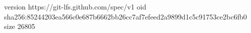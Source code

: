 version https://git-lfs.github.com/spec/v1
oid sha256:85244203ea566c0e687b6662bb26cc7af7efeed2a9899d1c5c91753ce2bc6fb0
size 26805
